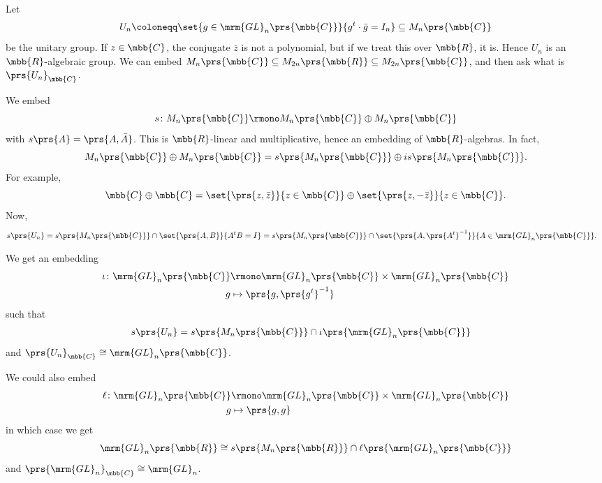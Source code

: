 \documentclass[10pt,a4paper,twoside,openany,hidelinks]{book}
\begin{document}
\begin{example}
Let
\begin{align*}
U_n \coloneqq \set{g \in \mrm{GL}_n\prs{\mbb{C}}}{g^t \cdot \bar{g} = I_n} \subseteq M_n\prs{\mbb{C}}
\end{align*}
be the unitary group.
If $z \in \mbb{C}$, the conjugate $\bar{z}$ is not a polynomial, but if we treat this over $\mbb{R}$, it is. Hence $U_n$ is an $\mbb{R}$-algebraic group. We can embed $M_n\prs{\mbb{C}} \subseteq M_{2n}\prs{\mbb{R}} \subseteq M_{2n}\prs{\mbb{C}}$, and then ask what is $\prs{U_n}_{\mbb{C}}$.

We embed
\[s \colon M_n\prs{\mbb{C}} \rmono M_n\prs{\mbb{C}} \oplus M_n\prs{\mbb{C}}\]
with $s\prs{A} = \prs{A, \bar{A}}$. This is $\mbb{R}$-linear and multiplicative, hence an embedding of $\mbb{R}$-algebras.
In fact,
\[M_n\prs{\mbb{C}} \oplus M_n\prs{\mbb{C}} = s\prs{M_n\prs{\mbb{C}}} \oplus i s\prs{M_n\prs{\mbb{C}}} \text{.}\]
For example, \[\mbb{C} \oplus \mbb{C} = \set{\prs{z,\bar{z}}}{z \in \mbb{C}} \oplus \set{\prs{z, -\bar{z}}}{z \in \mbb{C}} \text{.}\]
Now,
\begin{align*}
s\prs{U_n} &= s\prs{M_n\prs{\mbb{C}}} \cap \set{\prs{A,B}}{A^t B = I} = s\prs{M_n\prs{\mbb{C}}} \cap \set{\prs{A,\prs{A^t}^{-1}}}{A \in \mrm{GL}_n\prs{\mbb{C}}} \text{.}
\end{align*}

We get an embedding
\begin{align*}
\iota \colon \mrm{GL}_n\prs{\mbb{C}} &\rmono \mrm{GL}_n\prs{\mbb{C}} \times \mrm{GL}_n\prs{\mbb{C}} \\
g &\mapsto \prs{g, \prs{g^t}^{-1}}
\end{align*}
such that
\begin{align*}
s\prs{U_n} &= s\prs{M_n\prs{\mbb{C}}} \cap \iota\prs{\mrm{GL}_n\prs{\mbb{C}}}
\end{align*}
and $\prs{U_n}_{\mbb{C}} \cong \mrm{GL}_n\prs{\mbb{C}}$.

We could also embed
\begin{align*}
\ell \colon \mrm{GL}_n\prs{\mbb{C}} &\rmono \mrm{GL}_n\prs{\mbb{C}} \times \mrm{GL}_n\prs{\mbb{C}} \\
g &\mapsto \prs{g,g}
\end{align*}
in which case we get
\[\mrm{GL}_n\prs{\mbb{R}} \cong s\prs{M_n\prs{\mbb{R}}} \cap \ell\prs{\mrm{GL}_n\prs{\mbb{C}}}\]
and $\prs{\mrm{GL}_n}_{\mbb{C}} \cong \mrm{GL}_n$.
\end{example}

\end{document}
